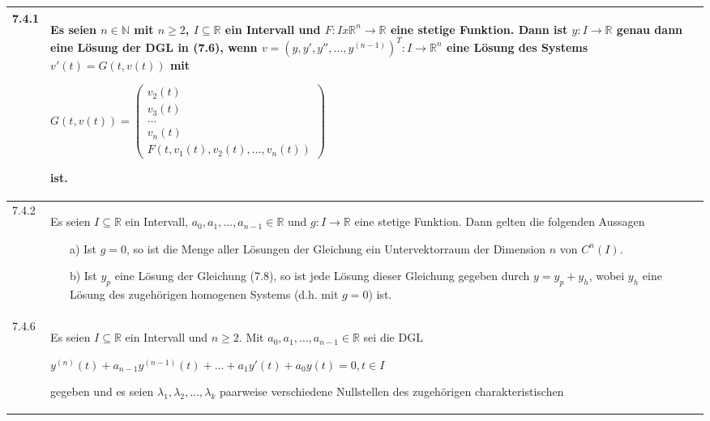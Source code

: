     \begin{longtable}{p{1cm} p{16cm}}
        \toprule

        7.4.1 & Es seien $n \in \mathbb{N}$ mit $n \geq 2$, $I \subseteq \mathbb{R}$ ein Intervall und $F: Ix \mathbb{R}^n \rightarrow \mathbb{R}$
                eine stetige Funktion. Dann ist $y: I \rightarrow \mathbb{R}$ genau dann eine Lösung der DGL in (7.6), wenn $v = (y,y',y''
                ,\dots, y^{(n-1)})^T:I \rightarrow \mathbb{R}^n$ eine Lösung des Systems $v'(t) = G(t,v(t))$ mit \hfill \break
                \centerline{$ G(t,v(t)) =   \begin{pmatrix}
                                            v_2(t) \\
                                            v_3(t) \\
                                            \dots \\
                                            v_n(t) \\
                                            F(t,v_1(t),v_2(t),\dots,v_n(t)) 
                                            \end{pmatrix}  $} 
                ist. \\
        \midrule
        7.4.2 & Es seien $I \subseteq \mathbb{R}$ ein Intervall, $a_0,a_1, \dots, a_{n-1} \in \mathbb{R}$ und $g: I \rightarrow \mathbb{R}$ eine
                stetige Funktion. Dann gelten die folgenden Aussagen
                \begin{itemize}[topsep=-0.5cm]
                    \item[a)] Ist $g=0$, so ist die Menge aller Lösungen der Gleichung ein Untervektorraum der Dimension $n$ von $C^n(I)$.
                    \item[b)] Ist $y_p$ eine Lösung der Gleichung (7.8), so ist jede Lösung dieser Gleichung gegeben durch $y = y_p + y_h$, wobei
                                $y_h$ eine Lösung des zugehörigen homogenen Systems (d.h. mit $g=0$) ist.   
                \end{itemize} \vspace{-0cm} \\
        \midrule
        7.4.6 & Es seien $I \subseteq \mathbb{R}$ ein Intervall und $n \geq 2$. Mit $a_0,a_1,\dots,a_{n-1} \in \mathbb{R}$ sei die DGL \hfill \break
                \centerline{$ y^{(n)}(t) + a_{n-1} y^{(n-1)} (t) + \dots + a_1 y'(t) +a_0y(t) = 0, t\in I$}
                gegeben und es seien $\lambda_1,\lambda_2,\dots,\lambda_k$ paarweise verschiedene Nullstellen des zugehörigen charakteristischen

\end{longtable}
